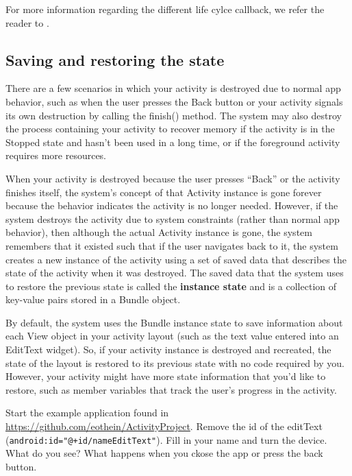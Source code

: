 For more information regarding the different life cylce callback, we refer the reader to \cite{Developers19}.

\subsection{Saving and restoring the state}
There are a few scenarios in which your activity is destroyed due to normal app behavior, such as when the user presses the Back button or your activity signals its own destruction by calling the finish() method. The system may also destroy the process containing your activity to recover memory if the activity is in the Stopped state and hasn't been used in a long time, or if the foreground activity requires more resources.

When your activity is destroyed because the user presses  ``Back'' or the activity finishes itself, the system's concept of that Activity instance is gone forever because the behavior indicates the activity is no longer needed. However, if the system destroys the activity due to system constraints (rather than normal app behavior), then although the actual Activity instance is gone, the system remembers that it existed such that if the user navigates back to it, the system creates a new instance of the activity using a set of saved data that describes the state of the activity when it was destroyed. The saved data that the system uses to restore the previous state is called the \textbf{instance state} and is a collection of key-value pairs stored in a Bundle object.

By default, the system uses the Bundle instance state to save information about each View object in your activity layout (such as the text value entered into an EditText widget). So, if your activity instance is destroyed and recreated, the state of the layout is restored to its previous state with no code required by you. However, your activity might have more state information that you'd like to restore, such as member variables that track the user's progress in the activity.

\begin{exercise}
	Start the example application found in \url{https://github.com/eothein/ActivityProject}. Remove the id of the editText (\texttt{android:id="@+id/nameEditText"}). Fill in your name and turn the device. What do you see? What happens when you ckose the app or press the back button. 	
\end{exercise}

